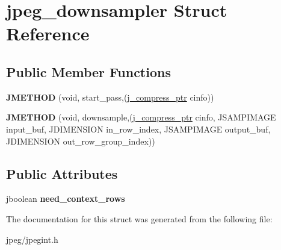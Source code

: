 \hypertarget{structjpeg__downsampler}{}\section{jpeg\+\_\+downsampler Struct Reference}
\label{structjpeg__downsampler}
\subsection*{Public Member Functions}
\begin{DoxyCompactItemize}
\item 
{\bfseries J\+M\+E\+T\+H\+OD} (void, start\+\_\+pass,(\hyperlink{structjpeg__compress__struct}{j\+\_\+compress\+\_\+ptr} cinfo))\hypertarget{structjpeg__downsampler_a1ca33229e63cdb80020c714f1cd28ea0}{}\label{structjpeg__downsampler_a1ca33229e63cdb80020c714f1cd28ea0}

\item 
{\bfseries J\+M\+E\+T\+H\+OD} (void, downsample,(\hyperlink{structjpeg__compress__struct}{j\+\_\+compress\+\_\+ptr} cinfo,           J\+S\+A\+M\+P\+I\+M\+A\+GE input\+\_\+buf, J\+D\+I\+M\+E\+N\+S\+I\+ON in\+\_\+row\+\_\+index,           J\+S\+A\+M\+P\+I\+M\+A\+GE output\+\_\+buf,           J\+D\+I\+M\+E\+N\+S\+I\+ON out\+\_\+row\+\_\+group\+\_\+index))\hypertarget{structjpeg__downsampler_a6d3133fbaf162d3e40a42c67489c0a01}{}\label{structjpeg__downsampler_a6d3133fbaf162d3e40a42c67489c0a01}

\end{DoxyCompactItemize}
\subsection*{Public Attributes}
\begin{DoxyCompactItemize}
\item 
jboolean {\bfseries need\+\_\+context\+\_\+rows}\hypertarget{structjpeg__downsampler_ae62e70bfb2ebdc79def4bdfc66b0b5aa}{}\label{structjpeg__downsampler_ae62e70bfb2ebdc79def4bdfc66b0b5aa}

\end{DoxyCompactItemize}


The documentation for this struct was generated from the following file\+:\begin{DoxyCompactItemize}
\item 
jpeg/jpegint.\+h\end{DoxyCompactItemize}
